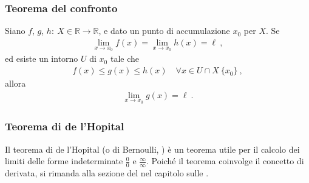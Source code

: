 \documentclass[letterpaper,10pt,english]{jupyterBook}
\begin{document}
\subsubsection{Teorema del confronto}
\label{\detokenize{ch/infinitesimal_calculus/analysis:teorema-del-confronto}}\label{\detokenize{ch/infinitesimal_calculus/analysis:infinitesimal-calculus-limits-thms-comparison}}
\sphinxAtStartPar
Siano \(f\), \(g\), \(h: \ X \in \mathbb{R} \rightarrow \mathbb{R}\), e dato un punto di accumulazione \(x_0\) per \(X\). Se
\begin{equation*}
\begin{split}\lim_{x \rightarrow x_0} f(x) = \lim_{x \rightarrow x_0} h(x) = \ell \ ,\end{split}
\end{equation*}
\sphinxAtStartPar
ed esiste un intorno \(U\) di \(x_0\) tale che
\begin{equation*}
\begin{split}f(x) \le g(x) \le h(x) \quad \forall x \in U \cap X \ \{ x_0 \} \ ,\end{split}
\end{equation*}
\sphinxAtStartPar
allora
\begin{equation*}
\begin{split}\lim_{x \rightarrow x_0} g(x) = \ell \ .\end{split}
\end{equation*}
\sphinxAtStartPar
{} 


\subsubsection{Teorema di de l’Hopital}
\label{\detokenize{ch/infinitesimal_calculus/analysis:teorema-di-de-l-hopital}}\label{\detokenize{ch/infinitesimal_calculus/analysis:infinitesimal-calculus-limits-thms-hopital}}
\sphinxAtStartPar
Il teorema di de l’Hopital (o di Bernoulli,  ) è un teorema utile per il calcolo dei limiti delle forme indeterminate \(\frac{0}{0}\) e \(\frac{\infty}{\infty}\). Poiché il teorema coinvolge il concetto di derivata, si rimanda alla sezione del {\hyperref[\detokenize{ch/infinitesimal_calculus/derivatives:infinitesimal-calculus-derivatives-thm-hopital}]{}} nel capitolo sulle {\hyperref[\detokenize{ch/infinitesimal_calculus/derivatives:infinitesimal-calculus-derivatives}]{}}.
\end{document}
